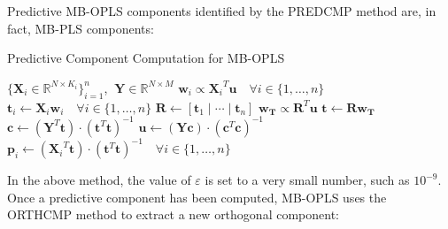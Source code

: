 \begin{doublespace}
Predictive MB-OPLS components identified by the PREDCMP method are, in fact,
MB-PLS components:
\end{doublespace}
\newpage

\begin{algorithm}[H]
\caption{Predictive Component Computation for MB-OPLS}
\label{algorithm.9.3}
\begin{algorithmic}[1]
\REQUIRE $\{\mathbf{X}_i \in \mathbb{R}^{N \times K_i}\}_{i=1}^n$,%
         $\:\mathbf{Y} \in \mathbb{R}^{N \times M}$
\REPEAT
  \STATE $\mathbf{w}_i \propto {\mathbf{X}_i}^T \mathbf{u}
          \quad \forall i \in \{1, \dots, n\}$
  \STATE $\mathbf{t}_i \gets \mathbf{X}_i \mathbf{w}_i
          \quad \forall i \in \{1, \dots, n\}$
  \STATE $\mathbf{R} \gets [\mathbf{t}_1 \mid\cdots\mid \mathbf{t}_n]$
  \STATE $\mathbf{w_T} \propto \mathbf{R}^T \mathbf{u}$
  \STATE $\mathbf{t} \gets \mathbf{R} \mathbf{w_T}$
  \STATE $\mathbf{c} \gets
          \left( \mathbf{Y}^T \mathbf{t} \right) \cdot
          \left( \mathbf{t}^T \mathbf{t} \right)^{-1}$
  \STATE $\mathbf{u} \gets
          \left( \mathbf{Y} \mathbf{c} \right) \cdot
          \left( \mathbf{c}^T \mathbf{c} \right)^{-1}$
\STATE $\mathbf{p}_i \gets
        \left( {\mathbf{X}_i}^T \mathbf{t} \right) \cdot
        \left( \mathbf{t}^T \mathbf{t} \right)^{-1}
        \quad \forall i \in \{1, \dots, n\}$
\end{algorithmic}
\end{algorithm}

\begin{doublespace}
In the above method, the value of $\varepsilon$ is set to a very small
number, such as $10^{-9}$. Once a predictive component has been computed,
MB-OPLS uses the ORTHCMP method to extract a new orthogonal component:
\end{doublespace}

